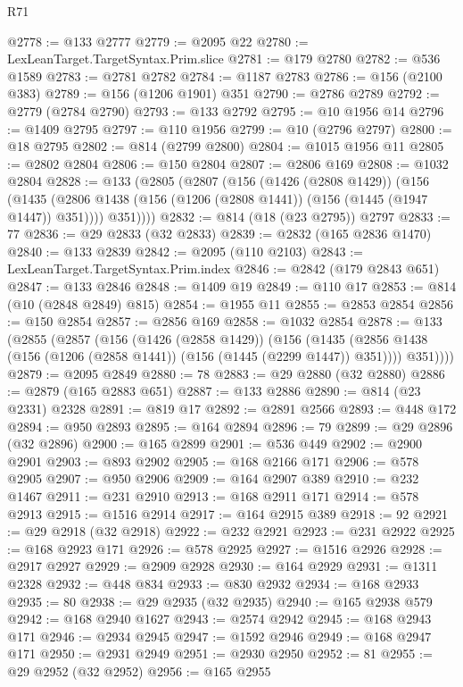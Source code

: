 \begin{lexlean}{R71}
\begin{coremodule}
@2778 := @133 @2777
@2779 := @2095 @22
@2780 := LexLeanTarget.TargetSyntax.Prim.slice
@2781 := @179 @2780
@2782 := @536 @1589
@2783 := @2781 @2782
@2784 := @1187 @2783
@2786 := @156 (@2100 @383)
@2789 := @156 (@1206 @1901) @351
@2790 := @2786 @2789
@2792 := @2779 (@2784 @2790)
@2793 := @133 @2792
@2795 := @10 @1956 @14
@2796 := @1409 @2795
@2797 := @110 @1956
@2799 := @10 (@2796 @2797)
@2800 := @18 @2795
@2802 := @814 (@2799 @2800)
@2804 := @1015 @1956 @11
@2805 := @2802 @2804
@2806 := @150 @2804
@2807 := @2806 @169
@2808 := @1032 @2804
@2828 := @133
    (@2805
      (@2807
        (@156
          (@1426 (@2808 @1429))
          (@156
            (@1435 (@2806 @1438 (@156 (@1206 (@2808 @1441)) (@156 (@1445 (@1947 @1447)) @351))))
            @351))))
@2832 := @814 (@18 (@23 @2795)) @2797
@2833 := 77
@2836 := @29 @2833 (@32 @2833)
@2839 := @2832 (@165 @2836 @1470)
@2840 := @133 @2839
@2842 := @2095 (@110 @2103)
@2843 := LexLeanTarget.TargetSyntax.Prim.index
@2846 := @2842 (@179 @2843 @651)
@2847 := @133 @2846
@2848 := @1409 @19
@2849 := @110 @17
@2853 := @814 (@10 (@2848 @2849) @815)
@2854 := @1955 @11
@2855 := @2853 @2854
@2856 := @150 @2854
@2857 := @2856 @169
@2858 := @1032 @2854
@2878 := @133
    (@2855
      (@2857
        (@156
          (@1426 (@2858 @1429))
          (@156
            (@1435 (@2856 @1438 (@156 (@1206 (@2858 @1441)) (@156 (@1445 (@2299 @1447)) @351))))
            @351))))
@2879 := @2095 @2849
@2880 := 78
@2883 := @29 @2880 (@32 @2880)
@2886 := @2879 (@165 @2883 @651)
@2887 := @133 @2886
@2890 := @814 (@23 @2331) @2328
@2891 := @819 @17
@2892 := @2891 @2566
@2893 := @448 @172
@2894 := @950 @2893
@2895 := @164 @2894
@2896 := 79
@2899 := @29 @2896 (@32 @2896)
@2900 := @165 @2899
@2901 := @536 @449
@2902 := @2900 @2901
@2903 := @893 @2902
@2905 := @168 @2166 @171
@2906 := @578 @2905
@2907 := @950 @2906
@2909 := @164 @2907 @389
@2910 := @232 @1467
@2911 := @231 @2910
@2913 := @168 @2911 @171
@2914 := @578 @2913
@2915 := @1516 @2914
@2917 := @164 @2915 @389
@2918 := 92
@2921 := @29 @2918 (@32 @2918)
@2922 := @232 @2921
@2923 := @231 @2922
@2925 := @168 @2923 @171
@2926 := @578 @2925
@2927 := @1516 @2926
@2928 := @2917 @2927
@2929 := @2909 @2928
@2930 := @164 @2929
@2931 := @1311 @2328
@2932 := @448 @834
@2933 := @830 @2932
@2934 := @168 @2933
@2935 := 80
@2938 := @29 @2935 (@32 @2935)
@2940 := @165 @2938 @579
@2942 := @168 @2940 @1627
@2943 := @2574 @2942
@2945 := @168 @2943 @171
@2946 := @2934 @2945
@2947 := @1592 @2946
@2949 := @168 @2947 @171
@2950 := @2931 @2949
@2951 := @2930 @2950
@2952 := 81
@2955 := @29 @2952 (@32 @2952)
@2956 := @165 @2955

\end{coremodule}
\end{lexlean}
